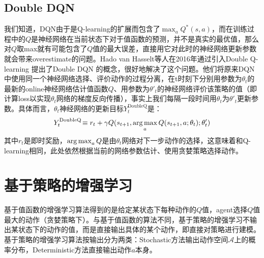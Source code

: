 \subsection{Double DQN}
我们知道，DQN由于是Q-learning的扩展而包含了$\max_a Q^*(s,a)$，而在训练过程中的$Q$是神经网络在当前状态下对于值函数的预测，并不是真实的最优值，那么对$Q$取max就有可能包含了$Q$值的最大误差，直接用它对此时的神经网络更新参数就会带来overestimate的问题。Hado van Hasselt等人在2016年通过引入Double Q-learning \cite{hado2010double} 提出了Double DQN \cite{hado2016deep}的概念，很好地解决了这个问题。他们将原来DQN中使用同一个神经网络选择、评价动作的过程分离，在t时刻下分别用参数为$\theta_t$的最新的online神经网络估计值函数$Q$、用参数为$\theta'_t$的神经网络评价该策略的值（即计算loss以实现$\theta_t$网络的梯度反向传播），事实上我们每隔一段时间用$\theta_t$为$\theta'_t$更新参数。具体而言，$\theta_t$神经网络的更新目标$Y^{\text{DoubleQ}}_t$是：
\begin{equation}
Y^{\text{DoubleQ}}_t \!\equiv r_{t} + \gamma Q(s_{t+1}, \operatorname*{arg\,max}_a Q(s_{t+1}, a; \theta_t); \theta'_t )
\label{doubledqn}
\end{equation}
其中$r_{t}$是即时奖励，$\operatorname*{arg\,max}_a Q$是由$\theta_t$网络对下一步动作的选择，这意味着和Q-learning相同，此处依然根据当前的网络参数估计、使用贪婪策略选择动作。
\section{基于策略的增强学习}
基于值函数的增强学习算法得到的是给定某状态下每种动作的$Q$值，agent选择$Q$值最大的动作（贪婪策略下）。与基于值函数的算法不同，基于策略的增强学习不输出某状态下的动作的值，而是直接输出具体的某个动作，即直接对策略进行建模。基于策略的增强学习算法按输出分为两类：Stochastic方法输出动作空间$\mathcal{A}$上的概率分布，Deterministic方法直接输出动作$a$本身。

